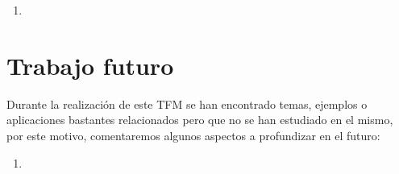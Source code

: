 \begin{enumerate}
	
	\item 
	
\end{enumerate}



\section{Trabajo futuro}

Durante la realización de este TFM se han encontrado temas, ejemplos o aplicaciones bastantes relacionados pero que no se han estudiado en el mismo, por este motivo, comentaremos algunos aspectos a profundizar en el futuro:

\begin{enumerate}
	
	\item 
	
\end{enumerate}




